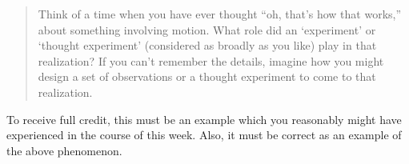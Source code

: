 \documentclass{reflection}
\begin{document}
\maketitle

\begin{quote}
    Think of a time when you have ever thought ``oh, that's how that works,'' about something involving motion. What role did an `experiment' or `thought experiment' (considered as broadly as you like) play in that realization? If you can't remember the details, imagine how you might design a set of observations or a thought experiment to come to that realization.
\end{quote}

To receive full credit, this must be an example which you reasonably might have experienced in the course of this week. Also, it must be correct as an example of the above phenomenon.

\end{document}
